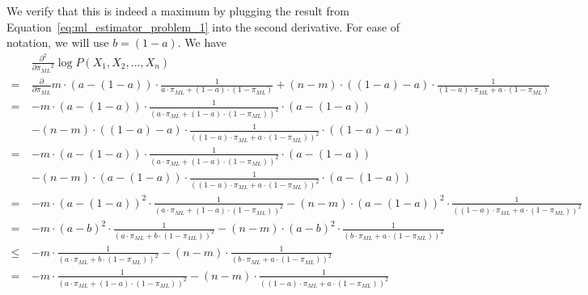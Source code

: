 \documentclass{article}
\begin{document}
We verify that this is indeed a maximum by plugging the result from Equation~\ref{eq:ml_estimator_problem_1} into the second derivative. 
For ease of notation, we will use $b = (1-a)$. We have
{
\allowdisplaybreaks
\begin{align*}
    &\frac{\partial^2}{\partial {\pi_{ML}}^2} \log P(X_1, X_2, \dots, X_n)\\
    =\ & \frac{\partial}{\partial {\pi_{ML}}} m \cdot (a - (1-a)) \cdot \frac{1}{a \cdot \pi_{ML} + (1-a) \cdot (1-\pi_{ML})}
    + (n - m) \cdot ((1-a) - a) \cdot \frac{1}{(1-a) \cdot \pi_{ML} + a \cdot (1-\pi_{ML})} \\
    =\ & -m \cdot (a - (1-a)) \cdot \frac{1}{\left( a \cdot \pi_{ML} + (1-a) \cdot (1-\pi_{ML}) \right)^2} \cdot \left( a - (1-a) \right) \\
    &- (n - m) \cdot ((1-a) - a) \cdot \frac{1}{\left( (1-a) \cdot \pi_{ML} + a \cdot (1-\pi_{ML}) \right)^2} \cdot \left( (1-a) -a \right) \\
    =\ & -m \cdot (a - (1-a)) \cdot \frac{1}{\left( a \cdot \pi_{ML} + (1-a) \cdot (1-\pi_{ML}) \right)^2} \cdot \left( a - (1-a) \right) \\
    &- (n - m) \cdot (a-(1-a)) \cdot \frac{1}{\left( (1-a) \cdot \pi_{ML} + a \cdot (1-\pi_{ML}) \right)^2} \cdot \left( a - (1-a) \right) \\
    =\ & - m \cdot {(a - (1-a))}^2 \cdot \frac{1}{\left( a \cdot \pi_{ML} + (1-a) \cdot (1-\pi_{ML}) \right)^2} - (n - m) \cdot {(a-(1-a))}^2 \cdot \frac{1}{\left( (1-a) \cdot \pi_{ML} + a \cdot (1-\pi_{ML}) \right)^2} \\
    =\ & -m \cdot {(a - b)}^2 \cdot \frac{1}{\left( a \cdot \pi_{ML} + b \cdot (1-\pi_{ML}) \right)^2} - (n - m) \cdot {(a-b)}^2 \cdot \frac{1}{\left( b \cdot \pi_{ML} + a \cdot (1-\pi_{ML}) \right)^2} \\
    \leq \ & - m \cdot \frac{1}{\left( a \cdot \pi_{ML} + b \cdot (1-\pi_{ML}) \right)^2} - (n - m) \cdot \frac{1}{\left( b \cdot \pi_{ML} + a \cdot (1-\pi_{ML}) \right)^2} \\
    = \ & - m \cdot \frac{1}{\left( a \cdot \pi_{ML} + (1-a) \cdot (1-\pi_{ML}) \right)^2} - (n - m) \cdot \frac{1}{\left( (1-a) \cdot \pi_{ML} + a \cdot (1-\pi_{ML}) \right)^2} \\

\end{align*}}
\end{document}
